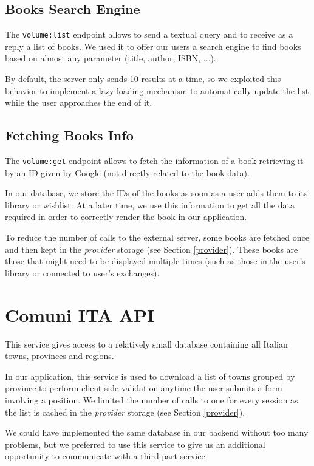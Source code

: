 \subsection{Books Search Engine}
The \texttt{volume:list} endpoint allows to send a textual query and to receive as a reply a list of books.
We used it to offer our users a search engine to find books based on almost any parameter (title, author, ISBN, ...).

By default, the server only sends 10 results at a time, so we exploited this behavior to implement a lazy loading mechanism to automatically update the list while the user approaches the end of it.

\clearpage
\subsection{Fetching Books Info}
The \texttt{volume:get} endpoint allows to fetch the information of a book retrieving it by an ID given by Google (not directly related to the book data).

In our database, we store the IDs of the books as soon as a user adds them to its library or wishlist.
At a later time, we use this information to get all the data required in order to correctly render the book in our application.

To reduce the number of calls to the external server, some books are fetched once and then kept in the \emph{provider} storage (see Section \ref{provider}).
These books are those that might need to be displayed multiple times (such as those in the user's library or connected to user's exchanges).

\section{Comuni ITA API}
This service gives access to a relatively small database containing all Italian towns, provinces and regions.

In our application, this service is used to download a list of towns grouped by province to perform client-side validation anytime the user submits a form involving a position.
We limited the number of calls to one for every session as the list is cached in the \emph{provider} storage (see Section \ref{provider}).

We could have implemented the same database in our backend without too many problems, but we preferred to use this service to give us an additional opportunity to communicate with a third-part service.

